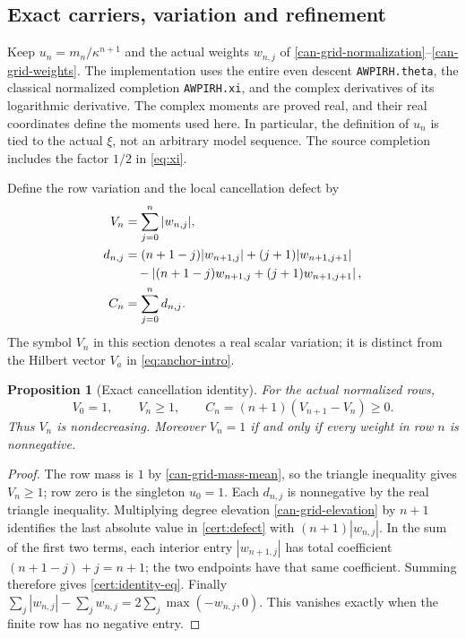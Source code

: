 \documentclass[11pt,a4paper]{article}
\numberwithin{equation}{section}
\newtheorem{proposition}[theorem]{Proposition}
\theoremstyle{definition}
\theoremstyle{remark}
\begin{document}
\subsection{Exact carriers, variation and refinement}

Keep $u_n=m_n/\kappa^{n+1}$ and the actual weights $w_{n,j}$ of
\eqref{can-grid-normalization}--\eqref{can-grid-weights}. The implementation
uses the entire even descent \texttt{AWPIRH.theta}, the classical normalized
completion \texttt{AWPIRH.xi}, and the complex derivatives of its logarithmic
derivative. The complex moments are proved real, and their real coordinates
define the moments used here. In particular,
the definition of $u_n$ is tied to the actual $\xi$, not an arbitrary model
sequence. The source completion includes the factor $1/2$ in \eqref{eq:xi}.

Define the row variation and the local cancellation defect by
\begin{align}
V_n&=\sum_{j=0}^n|w_{n,j}|,\label{cert:variation}\\
d_{n,j}&=(n+1-j)|w_{n+1,j}|+(j+1)|w_{n+1,j+1}|\notag\\
&\hspace{1em}-\left|(n+1-j)w_{n+1,j}+(j+1)w_{n+1,j+1}\right|,\label{cert:defect}\\
C_n&=\sum_{j=0}^n d_{n,j}.\label{cert:cancellation}
\end{align}
The symbol $V_n$ in this section denotes a real scalar variation; it is
distinct from the Hilbert vector $V_a$ in \eqref{eq:anchor-intro}.

\begin{proposition}[Exact cancellation identity]\label{cert:identity}
For the actual normalized rows,
\begin{equation}\label{cert:identity-eq}
V_0=1,\qquad V_n\ge1,\qquad
C_n=(n+1)(V_{n+1}-V_n)\ge0.
\end{equation}
Thus $V_n$ is nondecreasing. Moreover $V_n=1$ if and only if every
weight in row $n$ is nonnegative.
\end{proposition}
\begin{proof}
The row mass is $1$ by \eqref{can-grid-mass-mean}, so the triangle
inequality gives $V_n\ge1$; row zero is the singleton $u_0=1$.
Each $d_{n,j}$ is nonnegative by the real triangle inequality.
Multiplying degree elevation \eqref{can-grid-elevation} by $n+1$
identifies the last absolute value in \eqref{cert:defect} with
$(n+1)|w_{n,j}|$. In the sum of the first two terms, each interior
entry $|w_{n+1,j}|$ has total coefficient $(n+1-j)+j=n+1$;
the two endpoints have that same coefficient. Summing therefore gives
\eqref{cert:identity-eq}. Finally
$\sum_j|w_{n,j}|-\sum_jw_{n,j}=2\sum_j\max(-w_{n,j},0)$.
This vanishes exactly when the finite row has no negative entry.
\end{proof}
\end{document}
